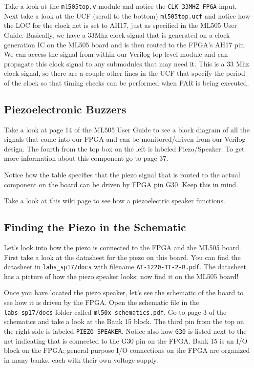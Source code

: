 \documentclass[11pt]{article}
\begin{document}
Take a look at the \verb|ml505top.v| module and notice the \verb|CLK_33MHZ_FPGA| input. Next take a look at the UCF (scroll to the bottom) \verb|ml505top.ucf| and notice how the LOC for the clock net is set to AH17, just as specified in the ML505 User Guide. Basically, we have a 33Mhz clock signal that is generated on a clock generation IC on the ML505 board and is then routed to the FPGA's AH17 pin. We can access the signal from within our Verilog top-level module and can propagate this clock signal to any submodules that may need it. This is a 33 Mhz clock signal, so there are a couple other lines in the UCF that specify the period of the clock so that timing checks can be performed when PAR is being executed.

\subsection{Piezoelectronic Buzzers}
Take a look at page 14 of the ML505 User Guide to see a block diagram of all the signals that come into our FPGA and can be monitored/driven from our Verilog design. The fourth from the top box on the left is labeled Piezo/Speaker. To get more information about this component go to page 37.

Notice how the table specifies that the piezo signal that is routed to the actual component on the board can be driven by FPGA pin G30. Keep this in mind.

Take a look at this \href{https://en.wikipedia.org/wiki/Piezoelectric_speaker}{wiki page} to see how a piezoelectric speaker functions.

\subsection{Finding the Piezo in the Schematic}
Let's look into how the piezo is connected to the FPGA and the ML505 board. First take a look at the datasheet for the piezo on this board. You can find the datasheet in \verb|labs_sp17/docs| with filename \verb|AT-1220-TT-2-R.pdf|. The datasheet has a picture of how the piezo speaker looks; now find it on the ML505 board!

Once you have located the piezo speaker, let's see the schematic of the board to see how it is driven by the FPGA. Open the schematic file in the \verb|labs_sp17/docs| folder called \verb|ml50x_schematics.pdf|. Go to page 3 of the schematics and take a look at the Bank 15 block. The third pin from the top on the right side is labeled \verb|PIEZO_SPEAKER|. Notice also how \verb|G30| is listed next to the net indicating that is connected to the G30 pin on the FPGA. Bank 15 is an I/O block on the FPGA; general purpose I/O connections on the FPGA are organized in many banks, each with their own voltage supply.
\end{document}
